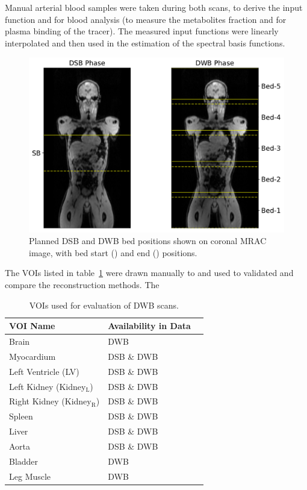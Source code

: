 Manual arterial blood samples were taken during both scans, to derive the input function and for blood analysis (to measure the metabolites fraction and for plasma binding of the tracer). The measured input functions were linearly interpolated and then used in the estimation of the spectral basis functions. 

\begin{figure} [h!]
\centering
\includegraphics[scale=0.42,angle=0]{3_Results/3_3_DWB_Reconstruction/figures/3_3_IsotoPK_CTRL_PositionsOnMR.pdf}
\caption{Planned DSB and DWB bed positions shown on coronal MRAC image, with bed start (\protect{}) and end (\protect{}) positions.} 
\label{fig_3_3:IsotoPK_BedPositionsOnMR}
\end{figure} 

The VOIs listed in table~\ref{tab:IsotoPK_VOIs}  were drawn manually to and used to validated and compare the reconstruction methods.
The 
\begin{table}[h!]
\centering
\caption{\label{tab:IsotoPK_VOIs} VOIs used for evaluation of DWB scans.}
\begin{tabular}{lll}
\toprule
\textbf{VOI Name} & \textbf{Availability in Data}  \\
\midrule
Brain        & DWB                 \\
Myocardium & DSB \& DWB              \\
Left Ventricle (LV) & DSB \& DWB     \\
Left Kidney (Kidney$_\mathrm{L}$) & DSB \& DWB  \\
Right Kidney (Kidney$_\mathrm{R}$) & DSB \& DWB \\
Spleen & DSB \& DWB \\
Liver  & DSB \& DWB \\
Aorta & DSB \& DWB \\
Bladder & DWB \\
Leg Muscle & DWB \\
\toprule
\end{tabular}
\end{table}

